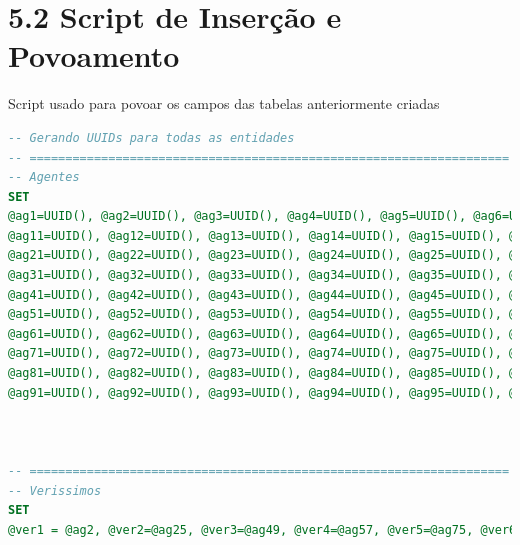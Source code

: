 \documentclass[12pt,a4paper]{report}
\begin{document}
\section{5.2 Script de Inserção e Povoamento}
Script usado para povoar os campos das tabelas anteriormente criadas

\begin{lstlisting}[language=SQL, caption=population.sql]
-- Gerando UUIDs para todas as entidades
-- ===================================================================
-- Agentes
SET
@ag1=UUID(), @ag2=UUID(), @ag3=UUID(), @ag4=UUID(), @ag5=UUID(), @ag6=UUID(), @ag7=UUID(), @ag8=UUID(), @ag9=UUID(), @ag10=UUID(),
@ag11=UUID(), @ag12=UUID(), @ag13=UUID(), @ag14=UUID(), @ag15=UUID(), @ag16=UUID(), @ag17=UUID(), @ag18=UUID(), @ag19=UUID(), @ag20=UUID(),
@ag21=UUID(), @ag22=UUID(), @ag23=UUID(), @ag24=UUID(), @ag25=UUID(), @ag26=UUID(), @ag27=UUID(), @ag28=UUID(), @ag29=UUID(), @ag30=UUID(),
@ag31=UUID(), @ag32=UUID(), @ag33=UUID(), @ag34=UUID(), @ag35=UUID(), @ag36=UUID(), @ag37=UUID(), @ag38=UUID(), @ag39=UUID(), @ag40=UUID(),
@ag41=UUID(), @ag42=UUID(), @ag43=UUID(), @ag44=UUID(), @ag45=UUID(), @ag46=UUID(), @ag47=UUID(), @ag48=UUID(), @ag49=UUID(), @ag50=UUID(),
@ag51=UUID(), @ag52=UUID(), @ag53=UUID(), @ag54=UUID(), @ag55=UUID(), @ag56=UUID(), @ag57=UUID(), @ag58=UUID(), @ag59=UUID(), @ag60=UUID(),
@ag61=UUID(), @ag62=UUID(), @ag63=UUID(), @ag64=UUID(), @ag65=UUID(), @ag66=UUID(), @ag67=UUID(), @ag68=UUID(), @ag69=UUID(), @ag70=UUID(),
@ag71=UUID(), @ag72=UUID(), @ag73=UUID(), @ag74=UUID(), @ag75=UUID(), @ag76=UUID(), @ag77=UUID(), @ag78=UUID(), @ag79=UUID(), @ag80=UUID(),
@ag81=UUID(), @ag82=UUID(), @ag83=UUID(), @ag84=UUID(), @ag85=UUID(), @ag86=UUID(), @ag87=UUID(), @ag88=UUID(), @ag89=UUID(), @ag90=UUID(),
@ag91=UUID(), @ag92=UUID(), @ag93=UUID(), @ag94=UUID(), @ag95=UUID(), @ag96=UUID(), @ag97=UUID(), @ag98=UUID(), @ag99=UUID(), @ag100=UUID();



-- ===================================================================
-- Verissimos
SET
@ver1 = @ag2, @ver2=@ag25, @ver3=@ag49, @ver4=@ag57, @ver5=@ag75, @ver6=@ag94;


\end{lstlisting}
\end{document}
